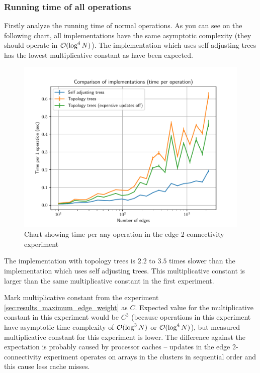 \subsubsection{Running time of all operations}

Firstly analyze the running time of normal operations. As you can see on the
following chart, all implementations have the same asymptotic complexity (they
should operate in ${\cal O}(\log^4 N)$). The implementation which uses self adjusting
trees has the lowest multiplicative constant as have been expected.

\begin{figure}[H]
\centering
{}\hsize
\includegraphics[width=\hsize]{charts/double_edge_connectivity_op.pdf}
\caption{Chart showing time per any operation in the edge 2-connectivity experiment}
\end{figure}

The implementation with topology trees is $2.2$ to $3.5$ times slower than the
implementation which uses self adjusting trees. This multiplicative constant is
larger than the same multiplicative constant in the first experiment.

Mark multiplicative constant from the experiment
\ref{sec:results_maximum_edge_weight} as $C$. Expected value for the
multiplicative constant in this experiment would be $C^3$ (because operations in
this experiment have asymptotic time complexity of ${\cal O}(\log^3 N)$ or ${\cal O}(\log^4
N)$), but measured multiplicative constant for this experiment is lower. The
difference against the expectation is probably caused by processor caches --
updates in the edge 2-connectivity experiment operates on arrays in the clusters
in sequential order and this cause less cache misses.


